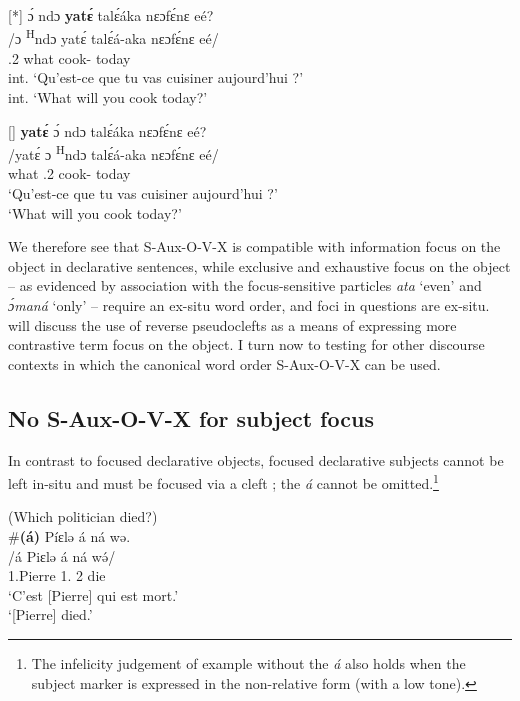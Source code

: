 \documentclass[output=paper,colorlinks,citecolor=brown
]{langscibook}
\begin{document}
\ea \label{whatcookQQ}
\ea
[*]{
\label{whatcookQQa}
\glll
{\db}ɔ́ ndɔ \textbf{yatɛ́} talɛ́áka	nɛɔfɛ́nɛ eé? \\
/ɔ \textsuperscript{H}ndɔ yatɛ́ talɛ́á-aka nɛɔfɛ́nɛ eé/ \\
{\db}\SM{}.2\SG{} \PRS{} what cook-\DUR{} today \Q{} \\
\glt
int. `Qu'est-ce que tu vas cuisiner aujourd'hui ?' \\ int. `What will you cook today?' \jambox*{[JO 1600] }
}


\ex
[]{
\glll
{\db}\textbf{yatɛ́} ɔ́ ndɔ talɛ́áka nɛɔfɛ́nɛ eé? \\
/yatɛ́	ɔ \textsuperscript{H}ndɔ talɛ́á-aka nɛɔfɛ́nɛ eé/ \\
{\db}what \SM{}.2\SG{} \PRS{}  cook-\DUR{} today \Q{} \\
\glt
`Qu'est-ce que tu vas cuisiner aujourd'hui ?' \\ `What will you cook today?' \jambox*{[JO 1601] }
}

\z
\z

We therefore see that S-Aux-O-V-X is compatible with information focus on the object in declarative sentences, while exclusive and exhaustive focus on the object -- as evidenced by association with the focus-sensitive particles \textit{ata} `even' and \textit{ɔ́maná} `only' -- require an ex-situ word order, and foci in questions are ex-situ.  will discuss the use of reverse pseudoclefts as a means of expressing more contrastive term focus on the object. I turn now to testing for other discourse contexts in which the canonical word order S-Aux-O-V-X can be used.

\subsection{No S-Aux-O-V-X for subject focus}
In contrast to focused declarative objects, focused declarative subjects cannot be left in-situ and must be focused via a cleft ; the \textit{á} \COP{} cannot be omitted.\footnote{The infelicity judgement of example  without the \textit{á} \COP{} also holds when the subject marker is expressed in the non-relative form (with a low tone).}

\ea
\label{subjfoccleftnocleft}
(Which politician died?)  \\
\glll
\textbf{$\#$(á)} Píɛlə á ná wə. \\
/á Piɛlə á ná wə́/ \\
{\db}\COP{} 1.Pierre 1\SM{}.\REL{} \PST{}2{} die \\
\glt
`C'est [Pierre]\textsubscript{\FOC{}} qui est mort.' \\  `[Pierre]\textsubscript{\FOC{}} died.' \jambox*{[EO 271] }
\end{document}
